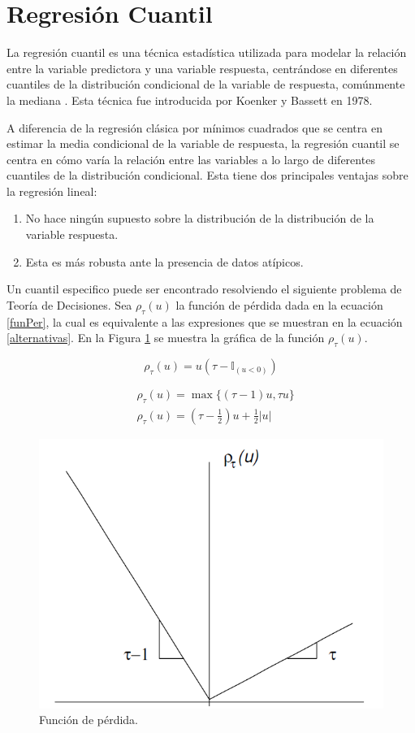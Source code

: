 \section{Regresión Cuantil}
    
    La regresión cuantil es una técnica estadística utilizada para modelar la relación entre la variable predictora y una variable respuesta, centrándose en diferentes cuantiles de la distribución condicional de la variable de respuesta, comúnmente la mediana \cite{cuantilReg}. Esta técnica fue introducida por Koenker y Bassett en 1978.  
    
    A diferencia de la regresión clásica por mínimos cuadrados que se centra en estimar la media condicional de la variable de respuesta, la regresión cuantil se centra en cómo varía la relación entre las variables a lo largo de diferentes cuantiles de la distribución condicional. Esta tiene dos principales ventajas sobre la regresión lineal:
    
    \begin{enumerate}
        \item No hace ningún supuesto sobre la distribución de la distribución de la variable respuesta.
        \item Esta es más robusta ante la presencia de datos atípicos. 
    \end{enumerate}

    Un cuantil especifico puede ser encontrado resolviendo el siguiente problema de Teoría de Decisiones. Sea $\rho_\tau(u)$ la función de pérdida dada en la ecuación \eqref{funPer}, la cual es equivalente a las expresiones que se muestran en la ecuación \eqref{alternativas}. En la Figura \ref{fig:perdida} se muestra la gráfica de la función $\rho_\tau(u)$.
    
    \begin{equation}\label{funPer}
    \rho_\tau(u)= u\left(\tau-\mathbb{I}_{(u<0)}\right)
    \end{equation}

    \begin{equation}\label{alternativas}
    \begin{split}
        &\rho_\tau(u)=\max \{(\tau-1) u, \tau u\}\\
        &\rho_\tau(u)=\left(\tau-\frac{1}{2}\right) u+\frac{1}{2}|u|
    \end{split}
    \end{equation}
    
    \begin{figure}[H]
        \centering
        \includegraphics[width = 0.5 \textwidth]{Imagenes/perdida.png}
        \caption{Función de pérdida.}
        \label{fig:perdida}
    \end{figure}
    
